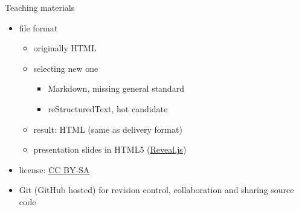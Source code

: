 \documentclass[xcolor={dvipsnames,usenames},beamer]{beamer}
\begin{document}
\begin{frame}{Teaching materials}

\begin{itemize}
 \item file format
 \begin{itemize}
  \item originally HTML
  \item selecting new one
  \begin{itemize}
   \item Markdown, missing general standard
   \item reStructuredText, hot candidate
  \end{itemize}
  \item result: HTML (same as delivery format)
  \item presentation slides in HTML5 (\href{http://lab.hakim.se/reveal-js}{Reveal.js})
 \end{itemize}
 \item license: \href{https://creativecommons.org/licenses/by-sa/4.0/}{CC BY-SA}
 \item Git (GitHub hosted)
  {\scriptsize for revision control, collaboration and sharing source code}
\end{itemize}


\end{frame}
\end{document}
